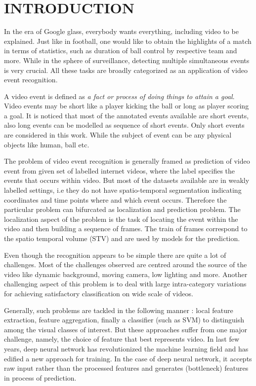 \chapter{INTRODUCTION}
\label{chap:intro}
In the era of Google glass, %
everybody wants everything, including video to be explained.  Just like in football, one would like to obtain the highlights of a match in terms of statistics, such as duration of ball control by respective team and more.  While in the sphere of surveillance, detecting multiple simultaneous events is very crucial.  All these tasks are broadly categorized as an application of video event recognition. 

\par A video event is defined as \textit{a fact or process of doing things to attain a goal}.  Video events may be short like a player kicking the ball or  long as player scoring a goal.  It is noticed that most of the annotated events available are short events, also long events can be modelled as sequence of short events.  Only short events are considered in this work.  While the subject of event can be any physical objects like human, ball etc.
\par The problem of video event recognition is generally framed as prediction of video event from given set of labelled internet videos, where the label specifies the events that occurs within video.  But most of the datasets available are in weakly labelled settings, i.e they do not have spatio-temporal segmentation indicating coordinates and time points where and which event occurs.  
Therefore the particular problem can bifurcated as localization and prediction problem.  The localization aspect of the problem is the task of locating the event within the video  %
and then building a sequence of frames.  The train of frames correspond to the spatio temporal volume (STV) and are used by models for the prediction.
\par Even though the recognition appears to be simple there are quite a lot of challenges. Most of the challenges observed are centred around the source of the video like dynamic background, moving camera, low lighting and more. Another challenging aspect of this problem is to deal with large intra-category variations for achieving satisfactory classification on wide scale of videos.
\par Generally, such problems are tackled in the following manner : local feature extraction, feature aggregation, finally a classifier (such as SVM) to distinguish among the visual classes of interest. But these approaches suffer from one major challenge, namely, the choice of feature that best represents video. In last few years, deep neural network has revolutionized the machine learning field and has edified a new approach for training. In the case of deep neural network, it accepts raw input rather than the processed features and generates (bottleneck) features in process of prediction. 
